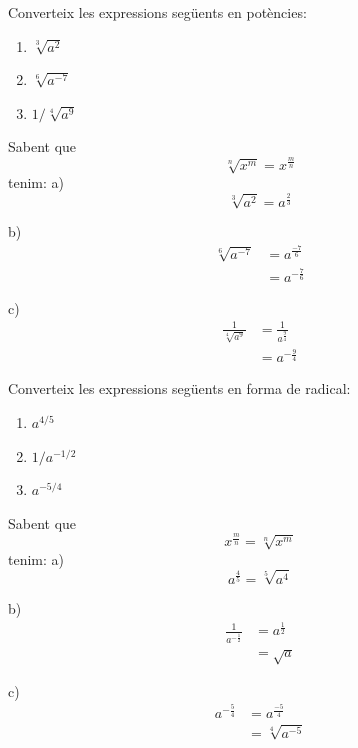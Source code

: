 \begin{exercici}
Converteix les expressions següents en potències:

\begin{enumerate}
\item[a)] $\sqrt[3]{a^{2}}$

\item[b)] $\sqrt[6]{a^{-7}}$

\item[c)] $1/\sqrt[4]{a^{9}}$
\end{enumerate}

\end{exercici}

\begin{solucio}
Sabent que%
\begin{equation*}
\sqrt[n]{x^{m}}=x^{\frac{m}{n}}
\end{equation*}%
tenim: a) 
\begin{equation*}
\sqrt[3]{a^{2}}=a^{\frac{2}{3}}
\end{equation*}

b) 
\begin{align*}
\sqrt[6]{a^{-7}} &=a^{\frac{-7}{6}} \\
&=a^{-\frac{7}{6}}
\end{align*}

c)%
\begin{align*}
\frac{1}{\sqrt[4]{a^{9}}} &=\frac{1}{a^{\frac{9}{4}}} \\
&=a^{-\frac{9}{4}}
\end{align*}
\end{solucio}

\begin{exercici}
Converteix les expressions següents en forma de radical:

\begin{enumerate}
\item[a)] $a^{4/5}$

\item[b)] $1/a^{-1/2}$

\item[c)] $a^{-5/4}$
\end{enumerate}

\end{exercici}

\begin{solucio}
Sabent que%
\begin{equation*}
x^{\frac{m}{n}}=\sqrt[n]{x^{m}}
\end{equation*}%
tenim: a)%
\begin{equation*}
a^{\frac{4}{5}}=\sqrt[5]{a^{4}}
\end{equation*}

b)%
\begin{align*}
\frac{1}{a^{-\frac{1}{2}}} &=a^{\frac{1}{2}} \\
&=\sqrt{a}
\end{align*}

c)%
\begin{align*}
a^{-\frac{5}{4}} &=a^{\frac{-5}{4}} \\
&=\sqrt[4]{a^{-5}}
\end{align*}
\end{solucio}

